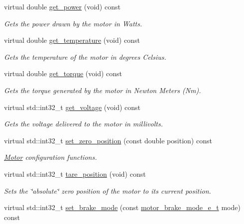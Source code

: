 \begin{DoxyCompactItemize}
virtual double \hyperlink{classpros_1_1Motor_a51b75dc245257487116e64fa2904d521}{get\+\_\+power} (void) const
\begin{DoxyCompactList}\small\item\em Gets the power drawn by the motor in Watts. \end{DoxyCompactList}\item 
virtual double \hyperlink{classpros_1_1Motor_a9fd793251b91c2ac0091c65f290f740d}{get\+\_\+temperature} (void) const
\begin{DoxyCompactList}\small\item\em Gets the temperature of the motor in degrees Celsius. \end{DoxyCompactList}\item 
virtual double \hyperlink{classpros_1_1Motor_a14e0c57c0ca7bde15f73414abf4c3c8e}{get\+\_\+torque} (void) const
\begin{DoxyCompactList}\small\item\em Gets the torque generated by the motor in Newton Meters (Nm). \end{DoxyCompactList}\item 
virtual std\+::int32\+\_\+t \hyperlink{classpros_1_1Motor_abe51732c37c2ec72a8bdceac7f6962cb}{get\+\_\+voltage} (void) const
\begin{DoxyCompactList}\small\item\em Gets the voltage delivered to the motor in millivolts. \end{DoxyCompactList}\item 
virtual std\+::int32\+\_\+t \hyperlink{classpros_1_1Motor_af20c036c1d5d68eb5e762c12f9a4b7fe}{set\+\_\+zero\+\_\+position} (const double position) const
\begin{DoxyCompactList}\small\item\em \hyperlink{classpros_1_1Motor}{Motor} configuration functions. \end{DoxyCompactList}\item 
virtual std\+::int32\+\_\+t \hyperlink{classpros_1_1Motor_a5d67803a65fa699a169a4ed5a107a964}{tare\+\_\+position} (void) const
\begin{DoxyCompactList}\small\item\em Sets the \char`\"{}absolute\char`\"{} zero position of the motor to its current position. \end{DoxyCompactList}\item 
virtual std\+::int32\+\_\+t \hyperlink{classpros_1_1Motor_ab51969169dc534537f79710261daa3dd}{set\+\_\+brake\+\_\+mode} (const \hyperlink{motors_8h_aa324a2881696428c9e3684f9ad23a83b}{motor\+\_\+brake\+\_\+mode\+\_\+e\+\_\+t} mode) const

\end{DoxyCompactItemize}
